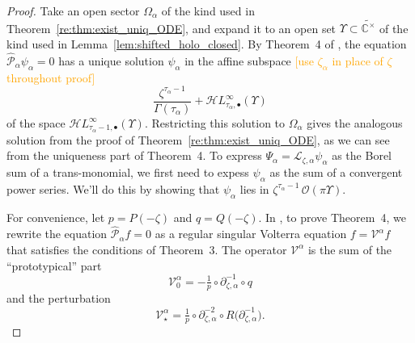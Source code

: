 \documentclass{article}
\newcommand{\singexp}[2]{\mathcal{H}L^\infty_{#1, #2}}
\newcommand{\singexpalg}[1]{\singexp{#1}{\bullet}}
\newcommand{\C}{\mathbb{C}}
\newcommand{\volterra}{\mathcal{V}}
\newcommand{\hardpart}{\mathcal{V}_0}
\newcommand{\softpart}{\mathcal{V}_\star}
\newcommand{\solwhole}{f}
\newcommand{\laplace}{\mathcal{L}}
\theoremstyle{definition}
\theoremstyle{plain}
\begin{document}
\begin{proof}
Take an open sector $\Omega_\alpha$ of the kind used in Theorem~\ref{re:thm:exist_uniq_ODE}, and expand it to an open set $\Upsilon \subset \widetilde{\C^\times}$ of the kind used in Lemma~\ref{lem:shifted_holo_closed}. By Theorem~4 of \cite{reg-sing-volterra}, the equation $\hat{\mathcal{P}}_\alpha \psi_\alpha = 0$ has a unique solution $\psi_\alpha$ in the affine subspace \textcolor{orange}{[use $\zeta_\alpha$ in place of $\zeta$ throughout proof]}
\[ \frac{\zeta^{\tau_\alpha-1}}{\Gamma(\tau_\alpha)} + \singexpalg{\tau_\alpha}(\Upsilon) \]
of the space $\singexpalg{\tau_\alpha-1}(\Upsilon)$. Restricting this solution to $\Omega_\alpha$ gives the analogous solution from the proof of Theorem~\ref{re:thm:exist_uniq_ODE}, as we can see from the uniqueness part of Theorem~4. To express $\Psi_\alpha = \laplace_{\zeta, \alpha} \psi_\alpha$ as the Borel sum of a trans-monomial, we first need to expess $\psi_\alpha$ as the sum of a convergent power series. We'll do this by showing that $\psi_\alpha$ lies in $\zeta^{\tau_\alpha - 1}\,\mathcal{O}(\pi \Upsilon)$.

For convenience, let $p = P(-\zeta)$ and $q = Q(-\zeta)$. In \cite{reg-sing-volterra}, to prove Theorem~4, we rewrite the equation $\hat{\mathcal{P}}_\alpha \solwhole = 0$ as a regular singular Volterra equation $\solwhole = \volterra^\alpha \solwhole$ that satisfies the conditions of Theorem~3. The operator $\volterra^\alpha$ is the sum of the ``prototypical'' part
\[ \hardpart^\alpha = -\tfrac{1}{p} \circ \partial^{-1}_{\zeta, \alpha} \circ q \]
and the perturbation
\[ \softpart^\alpha = \tfrac{1}{p} \circ \partial^{-2}_{\zeta, \alpha} \circ R\big(\partial^{-1}_{\zeta, \alpha}\big). \]


\end{proof}
\end{document}

